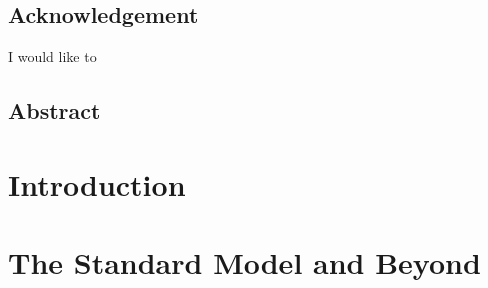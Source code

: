 \documentclass[12pt,a4paper]{report}
\begin{document}
\setcounter{page}{1}
\begin{center}
    \section*{\centering \Huge Acknowledgement}
    I would like to 
\end{center}
\clearpage


\begin{center}
    \section*{\centering \Huge Abstract}
    \noindent 
\end{center}
\clearpage

\tableofcontents
\clearpage

\pagestyle{fancy}
\fancyhead[L]{\empty}
\setlength{\headheight}{27pt} %

\setcounter{page}{1}

\chapter{Introduction}



\chapter{The Standard Model and Beyond}

\end{document}
